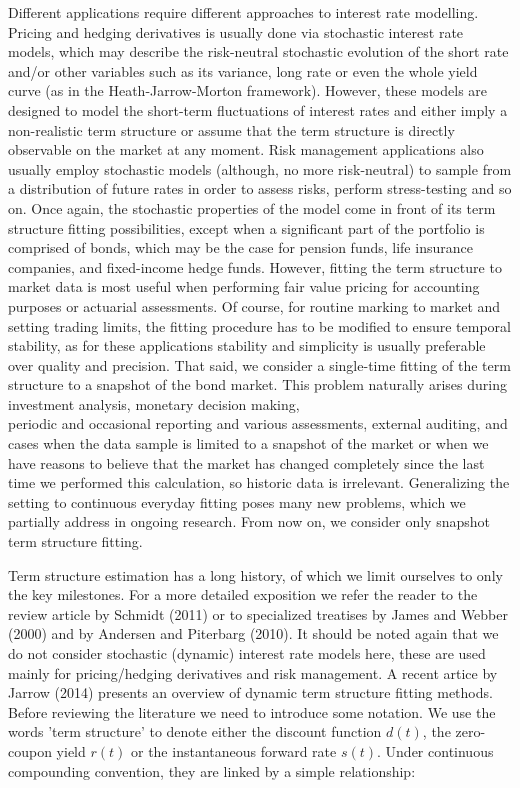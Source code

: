 \documentclass[10pt]{article}
\begin{document}
Different applications require different approaches to interest rate modelling. Pricing and hedging derivatives is usually done via stochastic interest rate models, which may describe the risk-neutral stochastic evolution of the short rate and/or other variables such as its variance, long rate or even the whole yield curve (as in the Heath-Jarrow-Morton framework). However, these models are designed to model the short-term fluctuations of interest rates and either imply a non-realistic term structure or assume that the term structure is directly observable on the market at any moment. Risk management applications also usually employ stochastic models (although, no more risk-neutral) to sample from a distribution of future rates in order to assess risks, perform stress-testing and so on. Once again, the stochastic properties of the model come in front of its term structure fitting possibilities, except when a significant part of the portfolio is comprised of bonds, which may be the case for pension funds, life insurance companies, and fixed-income hedge funds. However, fitting the term structure to market data is most useful when performing fair value pricing for accounting purposes or actuarial assessments. Of course, for routine marking to market and setting trading limits, the fitting procedure has to be modified to ensure temporal stability, as for these applications stability and simplicity is usually preferable over quality and precision. That said, we consider a single-time fitting of the term structure to a snapshot of the bond market. This problem naturally arises during investment analysis, monetary decision making,\\
periodic and occasional reporting and various assessments, external auditing, and cases when the data sample is limited to a snapshot of the market or when we have reasons to believe that the market has changed completely since the last time we performed this calculation, so historic data is irrelevant. Generalizing the setting to continuous everyday fitting poses many new problems, which we partially address in ongoing research. From now on, we consider only snapshot term structure fitting.

Term structure estimation has a long history, of which we limit ourselves to only the key milestones. For a more detailed exposition we refer the reader to the review article by Schmidt (2011) or to specialized treatises by James and Webber (2000) and by Andersen and Piterbarg (2010). It should be noted again that we do not consider stochastic (dynamic) interest rate models here, these are used mainly for pricing/hedging derivatives and risk management. A recent artice by Jarrow (2014) presents an overview of dynamic term structure fitting methods. Before reviewing the literature we need to introduce some notation. We use the words 'term structure' to denote either the discount function $d(t)$, the zero-coupon yield $r(t)$ or the instantaneous forward rate $s(t)$. Under continuous compounding convention, they are linked by a simple relationship:
\end{document}
